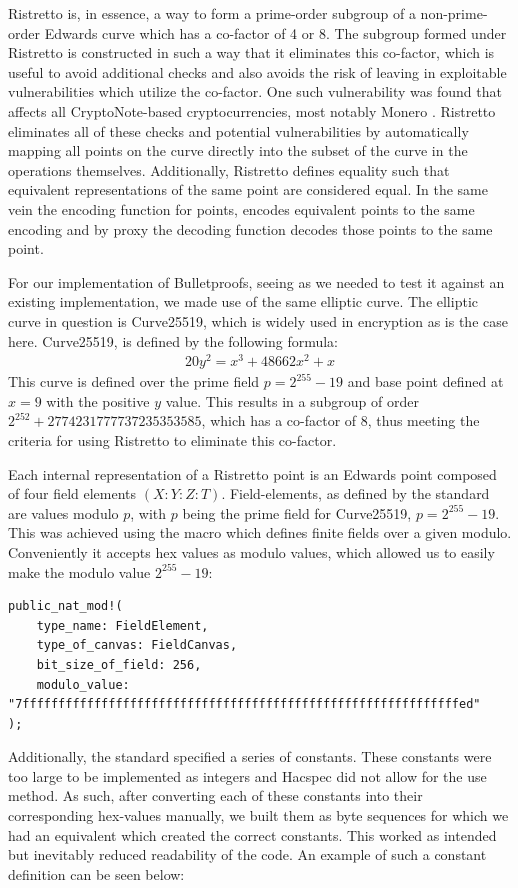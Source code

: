 \documentclass{article}
\newcommand*\ttvar[1]{\texttt{\expandafter\dottvar\detokenize{#1}\relax}}
\newcommand*\dottvar[1]{\ifx\relax#1\else
  \expandafter\ifx\string_#1\string_\allowbreak\else#1\fi
  \expandafter\dottvar\fi}
\newcommand{\eq}[1]{\begin{alignat*}{20}#1\end{alignat*}}
\begin{document}
Ristretto is, in essence, a way to form a prime-order subgroup of a 
non-prime-order Edwards curve which has a co-factor of 4 or 8. The 
subgroup formed under Ristretto is constructed in such a way that it 
eliminates this co-factor, which is useful to avoid additional checks 
and also avoids the risk of leaving in exploitable vulnerabilities 
which utilize the co-factor. One such vulnerability was found that 
affects all CryptoNote-based cryptocurrencies, most notably Monero 
\cite{cryptonote}. Ristretto eliminates all of these checks and  
potential vulnerabilities by automatically mapping all points on the 
curve directly into the subset of the curve in the operations 
themselves. Additionally, Ristretto defines equality such that equivalent 
representations of the same point are considered equal. In the same 
vein the encoding function for points, encodes equivalent points to the 
same encoding and by proxy the decoding function decodes those points 
to the same point.

For our implementation of Bulletproofs, seeing as we needed to test it
against an existing implementation, we made use of the same elliptic
curve. The elliptic curve in question is Curve25519, which is widely
used in encryption as is the case here. Curve25519, is defined by the
following formula:
\eq{
	y^2 = x^3 + 48662x^2 + x
}
This curve is defined over the prime field $p = 2^{255} - 19$ and base
point defined at $x = 9$ with the positive $y$ value. This results
in a subgroup of order $2^{252} + 2774231777737235353585$, which has
a co-factor of $8$, thus meeting the criteria for using Ristretto to
eliminate this co-factor.

Each internal representation of a Ristretto point is an Edwards point
composed of four field elements $(X : Y : Z : T)$. Field-elements,
as defined by the standard are values modulo $p$, with $p$ being the
prime field for Curve25519, $p = 2^{255} - 19$. This was achieved using
the \ttvar{public_nat_mod!()} macro which defines finite fields over
a given modulo. Conveniently it accepts hex values as modulo values,
which allowed us to easily make the modulo value $2^{255} - 19$:

\begin{lstlisting}
public_nat_mod!(
	type_name: FieldElement,
	type_of_canvas: FieldCanvas,
	bit_size_of_field: 256,
	modulo_value: "7fffffffffffffffffffffffffffffffffffffffffffffffffffffffffffffed"
);
\end{lstlisting}

Additionally, the standard specified a series of constants. These
constants were too large to be implemented as integers and Hacspec
did not allow for the use \ttvar{from_hex()} method. As such, after
converting each of these constants into their corresponding hex-values
manually, we built them as byte sequences for which we had an equivalent
\ttvar{from_byte_seq_be()} which created the correct constants. This
worked as intended but inevitably reduced readability of the code. An
example of such a constant definition can be seen below:
\end{document}
